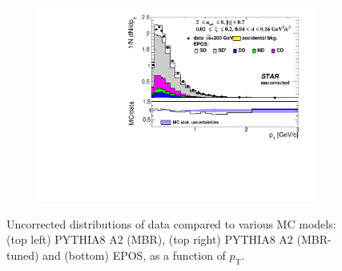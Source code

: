 \begin{figure}[h!]
\begin{subfigure}{.49\textwidth}
		\includegraphics[width=\linewidth, page=1]{chapters/chrgSTAR/img/nonSD/chrg/SDT_epos_xi0_RP_starsim_pt.pdf}
	\end{subfigure}
	\begin{minipage}{.49\textwidth}
		\caption{Uncorrected distributions of data compared to various MC models: (top left) PYTHIA8 A2 (MBR), (top right) PYTHIA8 A2 (MBR-tuned) and (bottom) EPOS, as a function of $p_{\mathrm{T}}$.}
		\label{fig:nonSDpt}
	\end{minipage}
	
\end{figure}
